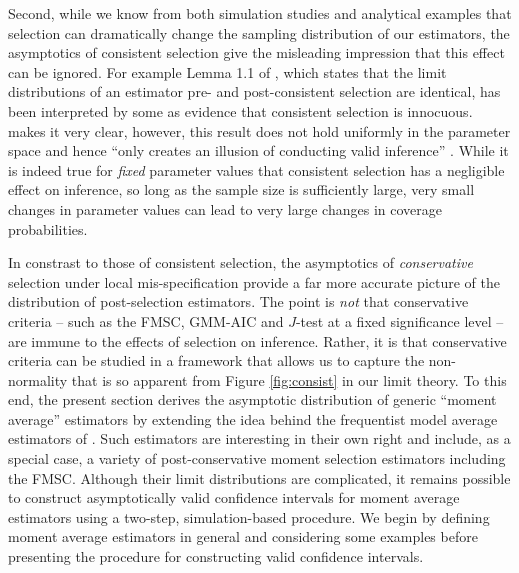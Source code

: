 Second, while we know from both simulation studies \citep{Demetrescu} and analytical examples \citep{LeebPoetscher2005} that selection can dramatically change the sampling distribution of our estimators, the asymptotics of consistent selection give the misleading impression that this effect can be ignored.
For example Lemma 1.1 of \citet[p.\ 168]{Poetscher1991}, which states that the limit distributions of an estimator pre- and post-consistent selection are identical, has been interpreted by some as evidence that consistent selection is innocuous. 
\citet[pp.\ 179--180]{Poetscher1991} makes it very clear, however, this result does not hold uniformly in the parameter space and hence ``only creates an illusion of conducting valid inference'' \citep[p.\ 22]{LeebPoetscher2005}.
While it is indeed true for \emph{fixed} parameter values that consistent selection has a negligible effect on inference, so long as the sample size is sufficiently large, very small changes in parameter values can lead to very large changes in coverage probabilities. 



In constrast to those of consistent selection, the asymptotics of \emph{conservative} selection  under local mis-specification provide a far more accurate picture of the distribution of post-selection estimators.
The point is \emph{not} that conservative criteria -- such as the FMSC, GMM-AIC and $J$-test at a fixed significance level -- are immune to the effects of selection on inference.
Rather, it is that conservative criteria can be studied in a framework that allows us to capture the non-normality that is so apparent from Figure \ref{fig:consist} in our limit theory.  
To this end, the present section derives the asymptotic distribution of generic ``moment average'' estimators by extending the idea behind the frequentist model average estimators of \cite{HjortClaeskens}. 
Such estimators are interesting in their own right and include, as a special case, a variety of post-conservative moment selection estimators including the FMSC.
Although their limit distributions are complicated, it remains possible to construct asymptotically valid confidence intervals for moment average estimators using a two-step, simulation-based procedure.
We begin by defining moment average estimators in general and considering some examples before presenting the procedure for constructing valid confidence intervals.

